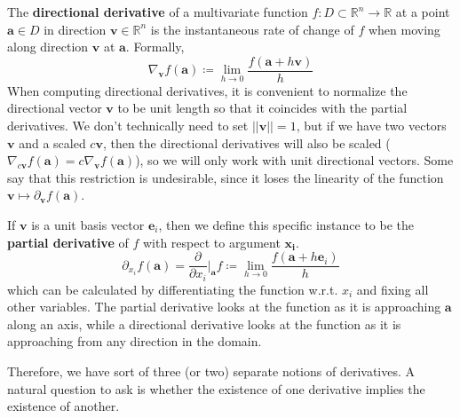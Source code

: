   \begin{definition}
    The \textbf{directional derivative} of a multivariate function $f: D \subset \mathbb{R}^n \longrightarrow \mathbb{R}$ at a point $\mathbf{a} \in D$ in direction $\mathbf{v} \in \mathbb{R}^n$ is the instantaneous rate of change of $f$ when moving along direction $\mathbf{v}$ at $\mathbf{a}$. Formally, 
    \begin{equation}
      \nabla_\mathbf{v} f(\mathbf{a}) \coloneqq \lim_{h \rightarrow 0} \frac{f(\mathbf{a} + h \mathbf{v})}{h}
    \end{equation}
    When computing directional derivatives, it is convenient to normalize the directional vector $\mathbf{v}$ to be unit length so that it coincides with the partial derivatives. We don't technically need to set $||\mathbf{v}|| = 1$, but if we have two vectors $\mathbf{v}$ and a scaled $c \mathbf{v}$, then the directional derivatives will also be scaled ($\nabla_{c \mathbf{v}} f (\mathbf{a}) = c \nabla_{\mathbf{v}} f (\mathbf{a})$), so we will only work with unit directional vectors. Some say that this restriction is undesirable, since it loses the linearity of the function $\mathbf{v} \mapsto \partial_\mathbf{v} f (\mathbf{a})$. 

    If $\mathbf{v}$ is a unit basis vector $\mathbf{e}_i$, then we define this specific instance to be the \textbf{partial derivative} of $f$ with respect to argument $\mathbf{x_i}$. 
    \begin{equation}
      \partial_{x_i} f (\mathbf{a}) = \frac{\partial}{\partial x_i} \bigg|_{\mathbf{a}} f \coloneqq \lim_{h \rightarrow 0} \frac{f(\mathbf{a} + h \mathbf{e}_i)}{h} 
    \end{equation}
    which can be calculated by differentiating the function w.r.t. $x_i$ and fixing all other variables. The partial derivative looks at the function as it is approaching $\mathbf{a}$ along an axis, while a directional derivative looks at the function as it is approaching from any direction in the domain. 
  \end{definition}

  Therefore, we have sort of three (or two) separate notions of derivatives. A natural question to ask is whether the existence of one derivative implies the existence of another. 

